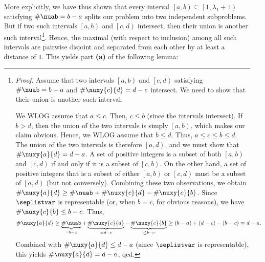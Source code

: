 \documentclass[numbers=enddot,12pt,final,onecolumn,notitlepage]{scrartcl}%
\theoremstyle{definition}
\begin{document}
More explicitly, we have thus shown that every interval $\left[a,b\right) \subseteq \left[1, \lambda_1+1\right)$ satisfying $\#\nuab = b-a$ splits our problem into two independent subproblems. But if two such intervals $\left[a,b\right)$ and $\left[c,d\right)$ intersect, then their union is another such interval\footnote{\textit{Proof.} Assume that two intervals $\left[a,b\right)$ and $\left[c,d\right)$ satisfying $\#\nuab = b-a$ and $\#\nuxy{c}{d} = d-c$ intersect. We need to show that their union is another such interval.
\par We WLOG assume that $a \leq c$. Then, $c \leq b$ (since the intervals intersect). If $b > d$, then the union of the two intervals is simply $\left[a,b\right)$, which makes our claim obvious. Hence, we WLOG assume that $b \leq d$. Thus, $a \leq c \leq b \leq d$. The union of the two intervals is therefore $\left[a, d\right)$, and we must show that $\#\nuxy{a}{d} = d-a$.
A set of positive integers is a subset of both $\left[a, b\right)$ and $\left[c, d\right)$ if and only if it is a subset of $\left[c, b\right)$. On the other hand, a set of positive integers that is a subset of either $\left[a, b\right)$ or $\left[c, d\right)$ must be a subset of $\left[a, d\right)$ (but not conversely). Combining these two observations, we obtain $\#\nuxy{a}{d} \geq \#\nuab + \#\nuxy{c}{d} - \#\nuxy{c}{b}$. Since $\seplistvar$ is representable (or, when $b=c$, for obvious reasons), we have $\#\nuxy{c}{b} \leq b-c$. Thus,
\[
\#\nuxy{a}{d} \geq \underbrace{\#\nuab}_{=b-a} + \underbrace{\#\nuxy{c}{d}}_{=d-c} - \underbrace{\#\nuxy{c}{b}}_{\leq b-c} \geq \left(b-a\right) + \left(d-c\right) - \left(b-c\right) = d-a.
\]
Combined with $\#\nuxy{a}{d} \leq d-a$ (since $\seplistvar$ is representable), this yields $\#\nuxy{a}{d} = d-a$, qed.}. Hence, the maximal (with respect to inclusion) among all such intervals are pairwise disjoint and separated from each other by at least a distance of $1$.
This yields part \textbf{(a)} of the following lemma:
\end{document}
